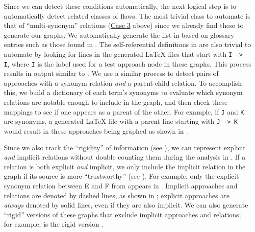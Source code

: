     Since we can detect these conditions automatically, the next logical step
    is to automatically detect related classes of flaws. The most trivial class
    to automate is that of ``multi-synonym'' relations
    (\hyperref[case-three]{Case 3} above) since we already find these to
    generate our graphs. We automatically generate the list in 
    based on glossary entries such as those found in
    .
    \label{selfCycles}
    The self-referential definitions in
     are also trivial to automate by looking for lines in the
    generated \LaTeX{} files that start with \texttt{I -> I}, where \texttt{I}
    is the label used for a test approach node in these graphs. This process
    results in output similar to . We use a similar
    process to detect pairs of approaches with a synonym relation \emph{and} a
    parent-child relation. To accomplish this, we build a dictionary of each
    term's synonyms to evaluate which synonym relations are notable enough to
    include in the graph, and then check these mappings to see if one appears
    as a parent of the other. For example, if \texttt{J} and \texttt{K} are
    synonyms, a generated \LaTeX{} file with a parent line starting with
    \texttt{J -> K} would result in these approaches being graphed as shown in
    .

    \label{graphRigid}
    Since we also track the ``rigidity'' of information (see ),
    we can represent explicit
    \emph{and} implicit relations without double counting them during the
    analysis in . If a relation is both explicit
    \emph{and} implicit, we only include the implicit relation in the graph
    if its source is more ``trustworthy'' (see ).
    For example, only the explicit synonym relation between E and F
    from  appears in .
    Implicit approaches and relations are denoted by dashed lines, as shown
    in ; explicit approaches are
    \emph{always} denoted by solid lines, even if they are also implicit.
    We can also generate ``rigid'' versions of these graphs that exclude
    implicit approaches and relations; for example,
     is the rigid version .

